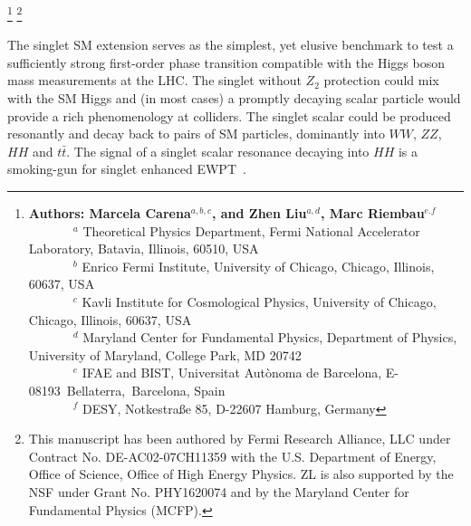 \footnote{{\bf Authors: Marcela Carena$^{a,b,c}$, and Zhen Liu$^{a,d}$, Marc Riembau$^{e.f}$}\\
~~~~~~~$^a$ Theoretical Physics Department, Fermi National Accelerator Laboratory, Batavia, Illinois, 60510, USA\\
~~~~~~~$^b$ Enrico Fermi Institute, University of Chicago, Chicago, Illinois, 60637, USA\\
~~~~~~~$^c$ Kavli Institute for Cosmological Physics, University of Chicago, Chicago, Illinois, 60637, USA\\
~~~~~~~$^d$ Maryland Center for Fundamental Physics, Department of Physics, University of Maryland, College Park, MD 20742\\
~~~~~~~$^e$ IFAE and BIST, Universitat Aut\`onoma de Barcelona, E-08193~Bellaterra,~Barcelona, Spain\\
~~~~~~~$^f$ DESY, Notkestra{\ss}e 85, D-22607 Hamburg, Germany
}
\footnote{This manuscript has been authored by Fermi Research Alliance, LLC under Contract No. DE-AC02-07CH11359 with the U.S. Department of Energy, Office of Science, Office of High Energy Physics. ZL is also supported by the NSF under Grant No. PHY1620074 and by the Maryland Center for Fundamental Physics (MCFP).}

The singlet SM extension  serves as the simplest, yet elusive benchmark to test  a sufficiently strong  first-order phase transition compatible with the Higgs boson mass measurements at the LHC.
The singlet without $Z_2$ protection could mix with the SM Higgs and (in most cases) a promptly decaying scalar particle would provide a rich phenomenology at colliders. The singlet scalar could be produced resonantly  and decay back to pairs of SM particles, dominantly into $WW$, $ZZ$, $HH$ and $t\bar t$. The signal of  a singlet scalar resonance decaying into $HH$ is a smoking-gun  for singlet enhanced EWPT~\cite{Chen:2014ask,Dawson:2015haa,Chen:2017qcz,Huang:2017jws,Robens:2016xkb,Lewis:2017dme,Dawson:2016ugw,Huang:2017nnw,deFlorian:2016spz}. 


